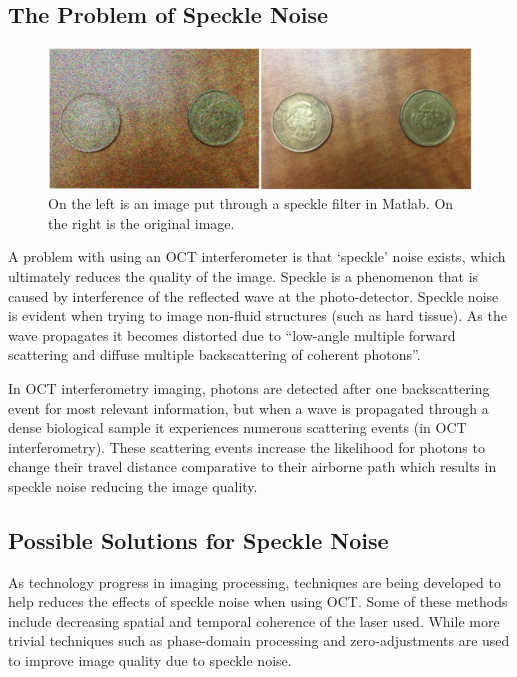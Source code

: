 \documentclass[%
reprint,
showpacs,preprintnumbers,
bibnotes,
amsmath,amssymb,
aps,
pra,
]{revtex4-1}
\begin{document}
	\subsection{\label{sec:level2} The Problem of Speckle Noise}
	\begin{figure}
		\centering
		\includegraphics[width=0.7\linewidth]{Figures/specklefilter2}
		\caption{On the left is an image put through a speckle filter in Matlab. On the right is the original image.}
		\label{fig:specklefilter2}
	\end{figure}
	A problem with using an OCT interferometer is that ‘speckle’ noise exists, which ultimately reduces the quality of the image. Speckle is a phenomenon that is caused by interference of the reflected wave at the photo-detector. Speckle noise is evident when trying to image non-fluid structures (such as hard tissue). As the wave propagates it becomes distorted due to “low-angle multiple forward scattering and diffuse multiple backscattering of coherent photons”. \cite{Popescu2007}

	In OCT interferometry imaging, photons are detected after one backscattering event for most relevant information, but when a wave is propagated through a dense biological sample it experiences numerous scattering events (in OCT interferometry). These scattering events increase the likelihood for photons to change their travel distance comparative to their airborne path which results in speckle noise reducing the image quality. \cite{Popescu2007}



	\subsection{\label{sec:level2} Possible Solutions for Speckle Noise}
	As technology progress in imaging processing, techniques are being developed to help reduces the effects of speckle noise when using OCT. Some of these methods include decreasing spatial and temporal coherence of the laser used. While more trivial techniques such as phase-domain processing and zero-adjustments are used to improve image quality due to speckle noise. \cite{Popescu2007}
\end{document}
